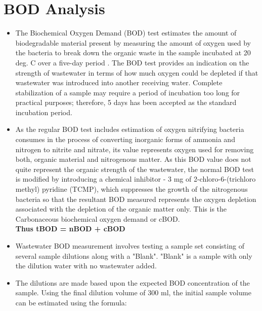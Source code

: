		\section{BOD Analysis}		
\begin{itemize}
\setlength\itemsep{1em}

\item The Biochemical Oxygen Demand (BOD) test estimates the amount of biodegradable material present by measuring the amount of oxygen used by the bacteria to break down the organic waste in the sample incubated at 20 deg. C over a five-day period . The BOD test provides an indication on the strength of wastewater in terms of how much oxygen could be depleted if that wastewater was introduced into another receiving water.  Complete stabilization of a sample may require a period of incubation too long for practical purposes; therefore, 5 days has been accepted as the standard incubation period.

\item As the regular BOD test includes estimation of oxygen nitrifying bacteria consumes in the process of converting inorganic forms of ammonia and nitrogen to nitrite and nitrate, its value represents oxygen used for removing both, organic material and nitrogenous matter.  As this BOD value does not quite represent the organic strength of the wastewater, the normal BOD test is modified by introducing a chemical inhibitor - 3 mg of 2-chloro-6-(trichloro methyl) pyridine (TCMP), which suppresses the growth of the nitrogenous bacteria so that the resultant BOD measured represents the oxygen depletion associated with the depletion of the organic matter only.  This is the Carbonaceous biochemical oxygen demand or cBOD. \\
\vspace{0.4cm}
\textbf{Thus tBOD = nBOD + cBOD}

\item Wastewater BOD measurement involves testing a sample set consisting of several sample dilutions along with a "Blank".  "Blank" is a sample with only the dilution water with no wastewater added. \\

\vspace{0.4cm}



\item The dilutions are made based upon the expected BOD concentration of the sample.  Using the final dilution volume of 300 ml, the initial sample volume can be estimated using the formula:\\
\vspace{0.4cm}


\end{itemize}
